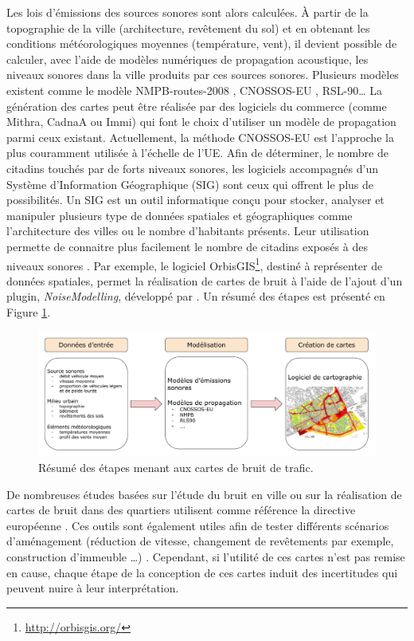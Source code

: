 Les lois d'émissions des sources sonores sont alors calculées. À partir de la topographie de la ville (architecture, revêtement du sol) et en obtenant les conditions météorologiques moyennes (température, vent), il devient possible de calculer, avec l'aide de modèles numériques de propagation acoustique, les niveaux sonores dans la ville produits par ces sources sonores. Plusieurs modèles existent comme le modèle NMPB-routes-2008 \cite{setra_prevision_2009-1, setra_prevision_2009-2},  CNOSSOS-EU \cite{CNOSSOS}, RSL-90\dots{} La génération des cartes peut être réalisée par des logiciels du commerce (comme Mithra, CadnaA ou Immi) qui font le choix d'utiliser un modèle de propagation parmi ceux existant. Actuellement, la méthode CNOSSOS-EU est l'approche la plus couramment utilisée à l'échelle de l'UE. Afin de déterminer, le nombre de citadins touchés par de forts niveaux sonores, les logiciels accompagnés d'un Système d'Information Géographique (SIG) sont ceux qui offrent le plus de possibilités. Un SIG est un outil informatique conçu pour stocker, analyser et manipuler plusieurs type de données spatiales et géographiques comme l'architecture des villes ou le nombre d'habitants présents. Leur utilisation permette de connaitre plus facilement le nombre de citadins exposés à des niveaux sonores \cite{murphy2011scenario}. Par exemple, le logiciel OrbisGIS\footnote{\url{http://orbisgis.org/}}, destiné à représenter de données spatiales, permet la réalisation de cartes de bruit à l'aide de l'ajout d'un plugin, \textit{NoiseModelling}, développé par \cite{fortin}. Un résumé des étapes est présenté en Figure \ref{fig:cartographie}.\\

\begin{figure}[t]
\centering
\includegraphics[width=.85\linewidth]{./figures/cartographie/cartographie.pdf}
\caption{Résumé des étapes menant aux cartes de bruit de trafic.}
\label{fig:cartographie}
\end{figure}


De nombreuses études basées sur l'étude du bruit en ville ou sur la réalisation de cartes de bruit dans des quartiers utilisent comme référence la directive européenne \cite{murphy_environmental_2006, murphy_estimating_2009, Eriksson_residential_2013}. Ces outils sont également utiles afin de tester différents scénarios d'aménagement (réduction de vitesse, changement de revêtements par exemple, construction d'immeuble \dots) \cite{murphy2011scenario,guedes2011influence}. Cependant, si l'utilité de ces cartes n'est pas remise en cause, chaque étape de la conception de ces cartes induit des incertitudes qui peuvent nuire à leur interprétation. 

